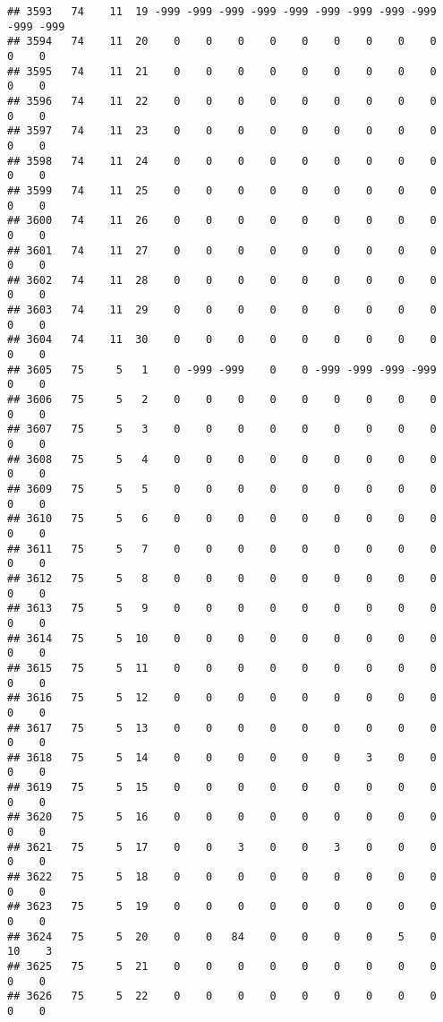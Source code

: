 \documentclass[]{article}
\begin{document}
\begin{verbatim}
## 3593   74    11  19 -999 -999 -999 -999 -999 -999 -999 -999 -999 -999 -999
## 3594   74    11  20    0    0    0    0    0    0    0    0    0    0    0
## 3595   74    11  21    0    0    0    0    0    0    0    0    0    0    0
## 3596   74    11  22    0    0    0    0    0    0    0    0    0    0    0
## 3597   74    11  23    0    0    0    0    0    0    0    0    0    0    0
## 3598   74    11  24    0    0    0    0    0    0    0    0    0    0    0
## 3599   74    11  25    0    0    0    0    0    0    0    0    0    0    0
## 3600   74    11  26    0    0    0    0    0    0    0    0    0    0    0
## 3601   74    11  27    0    0    0    0    0    0    0    0    0    0    0
## 3602   74    11  28    0    0    0    0    0    0    0    0    0    0    0
## 3603   74    11  29    0    0    0    0    0    0    0    0    0    0    0
## 3604   74    11  30    0    0    0    0    0    0    0    0    0    0    0
## 3605   75     5   1    0 -999 -999    0    0 -999 -999 -999 -999    0    0
## 3606   75     5   2    0    0    0    0    0    0    0    0    0    0    0
## 3607   75     5   3    0    0    0    0    0    0    0    0    0    0    0
## 3608   75     5   4    0    0    0    0    0    0    0    0    0    0    0
## 3609   75     5   5    0    0    0    0    0    0    0    0    0    0    0
## 3610   75     5   6    0    0    0    0    0    0    0    0    0    0    0
## 3611   75     5   7    0    0    0    0    0    0    0    0    0    0    0
## 3612   75     5   8    0    0    0    0    0    0    0    0    0    0    0
## 3613   75     5   9    0    0    0    0    0    0    0    0    0    0    0
## 3614   75     5  10    0    0    0    0    0    0    0    0    0    0    0
## 3615   75     5  11    0    0    0    0    0    0    0    0    0    0    0
## 3616   75     5  12    0    0    0    0    0    0    0    0    0    0    0
## 3617   75     5  13    0    0    0    0    0    0    0    0    0    0    0
## 3618   75     5  14    0    0    0    0    0    0    3    0    0    0    0
## 3619   75     5  15    0    0    0    0    0    0    0    0    0    0    0
## 3620   75     5  16    0    0    0    0    0    0    0    0    0    0    0
## 3621   75     5  17    0    0    3    0    0    3    0    0    0    0    0
## 3622   75     5  18    0    0    0    0    0    0    0    0    0    0    0
## 3623   75     5  19    0    0    0    0    0    0    0    0    0    0    0
## 3624   75     5  20    0    0   84    0    0    0    0    5    0   10    3
## 3625   75     5  21    0    0    0    0    0    0    0    0    0    0    0
## 3626   75     5  22    0    0    0    0    0    0    0    0    0    0    0

\end{verbatim}
\end{document}
